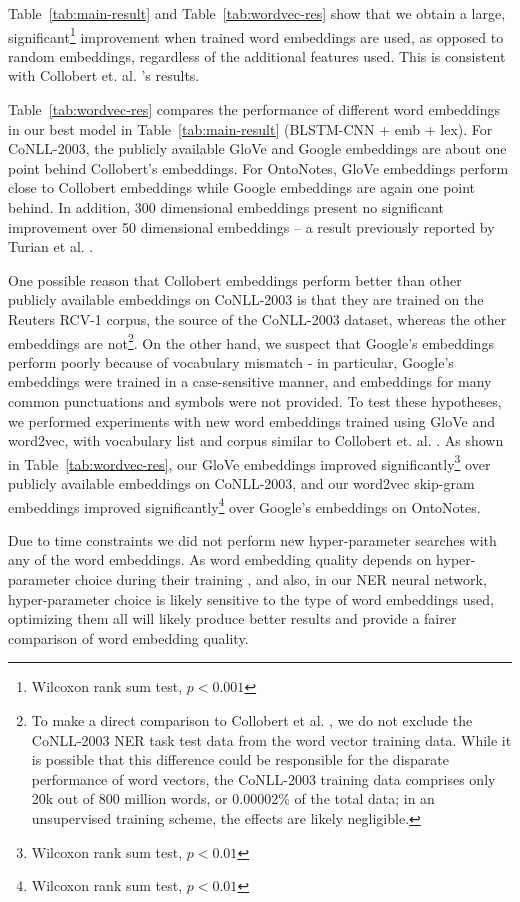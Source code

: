 \documentclass[11pt,letterpaper]{article}
\begin{document}
Table~\ref{tab:main-result} and Table~\ref{tab:wordvec-res} show that we obtain a large, significant\footnote{Wilcoxon rank sum test, $p < 0.001$} improvement when trained word embeddings are used, as opposed to random embeddings, regardless of the additional features used. This is consistent with  Collobert et. al. 's results.

Table~\ref{tab:wordvec-res} compares the performance of different word embeddings in our best model in Table~\ref{tab:main-result} (BLSTM-CNN + emb + lex). For CoNLL-2003, the publicly available GloVe and Google embeddings are about one point behind Collobert's embeddings. For OntoNotes, GloVe embeddings perform close to Collobert embeddings while Google embeddings are again one point behind. In addition, 300 dimensional embeddings present no significant improvement over 50 dimensional embeddings \--- a result previously reported by Turian et al. .

One possible reason that Collobert embeddings perform better than other publicly available embeddings on CoNLL-2003 is that they are trained on the Reuters RCV-1 corpus, the source of the CoNLL-2003 dataset, whereas the other embeddings are not\footnote{To make a direct comparison to Collobert et al. , we do not exclude the CoNLL-2003 NER task test data from the word vector training data. While it is possible that this difference could be responsible for the disparate performance of word vectors, the CoNLL-2003 training data comprises only 20k out of 800 million words, or 0.00002\% of the total data; in an unsupervised training scheme, the effects are likely negligible.}. On the other hand, we suspect that Google's embeddings perform poorly because of vocabulary mismatch \-- in particular, Google's embeddings were trained in a case-sensitive manner, and embeddings for many common punctuations and symbols were not provided. To test these hypotheses, we performed experiments with new word embeddings trained using GloVe and word2vec, with vocabulary list and corpus similar to Collobert et. al. . As shown in Table~\ref{tab:wordvec-res}, our GloVe embeddings improved significantly\footnote{Wilcoxon rank sum test, $p < 0.01$} over publicly available embeddings on CoNLL-2003, and our word2vec skip-gram  embeddings improved significantly\footnote{Wilcoxon rank sum test, $p < 0.01$} over Google's embeddings on OntoNotes. 



Due to time constraints we did not perform new hyper-parameter searches with any of the word embeddings. As word embedding quality depends on hyper-parameter choice during their training \cite{pennington2014}, and also, in our NER neural network, hyper-parameter choice is likely sensitive to the type of word embeddings used, optimizing them all will likely produce better results and provide a fairer comparison of word embedding quality.
\end{document}
